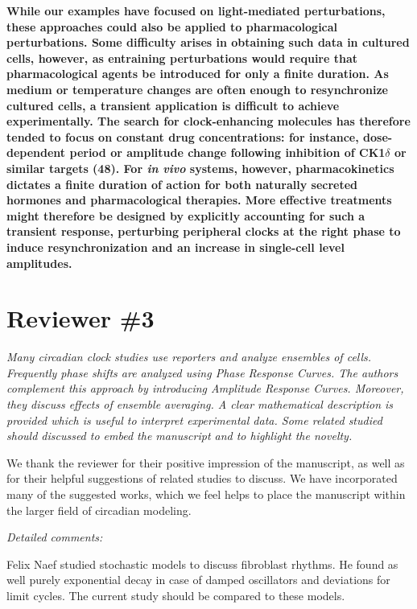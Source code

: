 \documentclass[11pt, letterpaper]{article}
\newenvironment{reviewer}{\itshape\color{gray}}{}
\newenvironment{manuscript}[1]{\begin{center}\begin{tcolorbox}[colback=green!5!white,colframe=green!75!black,width=0.8\textwidth,title={#1},breakable,fonttitle=\bfseries]}{\end{tcolorbox}\end{center}}
\begin{document}
\begin{manuscript}{Page 18}
\bfseries
While our examples have focused on light-mediated perturbations, these approaches could also be applied to pharmacological perturbations.
Some difficulty arises in obtaining such data in cultured cells, however, as entraining perturbations would require that pharmacological agents be introduced for only a finite duration.
As medium or temperature changes are often enough to resynchronize cultured cells, a transient application is difficult to achieve experimentally.
The search for clock-enhancing molecules has therefore tended to focus on constant drug concentrations: for instance, dose-dependent period or amplitude change following inhibition of CK1$\delta$ or similar targets (48).
For {\itshape in vivo} systems, however, pharmacokinetics dictates a finite duration of action for both naturally secreted hormones and pharmacological therapies.
More effective treatments might therefore be designed by explicitly accounting for such a transient response, perturbing peripheral clocks at the right phase to induce resynchronization and an increase in single-cell level amplitudes.
\end{manuscript}

\section*{Reviewer \#3}

\begin{reviewer}
Many circadian clock studies use reporters and analyze ensembles of cells.
Frequently phase shifts are analyzed using Phase Response Curves.
The authors complement this approach by introducing Amplitude Response Curves.
Moreover, they discuss effects of ensemble averaging.
A clear mathematical description is provided which is useful to interpret experimental data.
Some related studied should discussed to embed the manuscript and to highlight the novelty.

\end{reviewer}
 
We thank the reviewer for their positive impression of the manuscript, as well as for their helpful suggestions of related studies to discuss. We have incorporated many of the suggested works, which we feel helps to place the manuscript within the larger field of circadian modeling.

\begin{reviewer}
Detailed comments: 
 
Felix Naef studied stochastic models to discuss fibroblast rhythms.
He found as well purely exponential decay in case of damped oscillators and deviations for limit cycles.
The current study should be compared to these models.
\end{reviewer}
 
\end{document}

